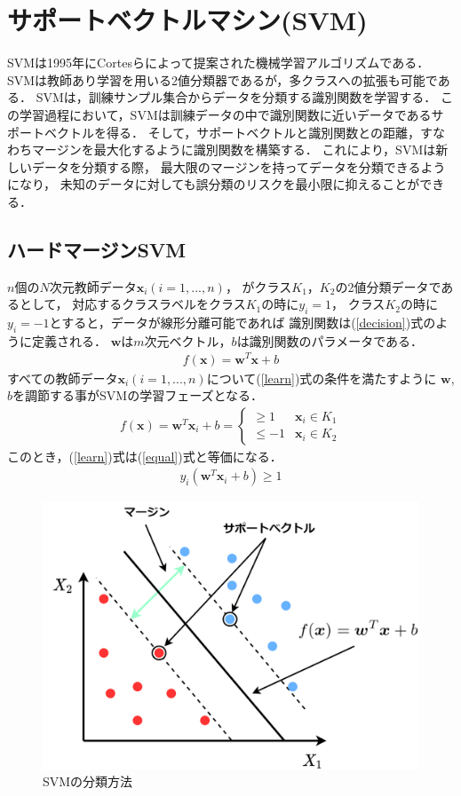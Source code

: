 \section{サポートベクトルマシン(SVM)}
SVMは1995年にCortesらによって提案された機械学習アルゴリズムである\cite{svm}．
SVMは教師あり学習を用いる2値分類器であるが，多クラスへの拡張も可能である．
SVMは，訓練サンプル集合からデータを分類する識別関数を学習する．
この学習過程において，SVMは訓練データの中で識別関数に近いデータであるサポートベクトルを得る．
そして，サポートベクトルと識別関数との距離，すなわちマージンを最大化するように識別関数を構築する．
これにより，SVMは新しいデータを分類する際，
最大限のマージンを持ってデータを分類できるようになり，
未知のデータに対しても誤分類のリスクを最小限に抑えることができる．
\subsection{ハードマージンSVM}
$n$個の$N$次元教師データ$\boldsymbol{x}_i(i=1,...,n)$，
がクラス$K_1$，$K_2$の2値分類データであるとして，
対応するクラスラベルをクラス$K_1$の時に$y_i= 1$，
クラス$K_2$の時に$y_i= -1$とすると，データが線形分離可能であれば
識別関数は(\ref{decision})式のように定義される．
 $\boldsymbol{w}$は$m$次元ベクトル，$b$は識別関数のパラメータである．
\begin{align}
    \label{decision}
f(\boldsymbol{x}) = \boldsymbol{w}^T \boldsymbol{x} + b
\end{align}
すべての教師データ$\boldsymbol{x}_i(i=1,...,n)$について(\ref{learn})式の条件を満たすように
$\boldsymbol{w}$, $b$を調節する事がSVMの学習フェーズとなる．
\begin{align}
    \label{learn}
    f(\boldsymbol{x}) = \boldsymbol{w}^T \boldsymbol{x}_i + b =
    \begin{cases}
        \geq 1&  \boldsymbol{x}_i \in K_1 \\
        \leq  -1& \boldsymbol{x}_i \in K_2
    \end{cases}
\end{align}
このとき，(\ref{learn})式は(\ref{equal})式と等価になる．
\begin{align}
    \label{equal}
    y_i(\boldsymbol{w}^T \boldsymbol{x}_i + b) \geq 1
\end{align}
\begin{figure}
    \centering
    \includegraphics[width=0.6\linewidth]{svm_support.png}
    \caption{SVMの分類方法}
    \label{svm_support}
\end{figure}
